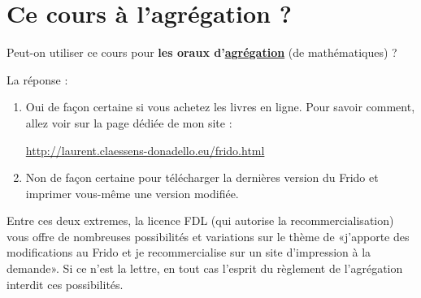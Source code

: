 
\section*{Ce cours à l'agrégation ?}

Peut-on utiliser ce cours pour \textbf{les oraux d'\href{http://agreg.org/}{agrégation}} (de mathématiques) ?  

La réponse :
\begin{enumerate}
    \item
        Oui de façon certaine si vous achetez les livres en ligne. Pour savoir comment, allez voir sur la page dédiée de mon site :
        \begin{center}
            \url{http://laurent.claessens-donadello.eu/frido.html}
        \end{center}
    \item
        Non de façon certaine pour télécharger la dernières version du Frido et imprimer vous-même une version modifiée.
\end{enumerate}
Entre ces deux extremes, la licence FDL (qui autorise la recommercialisation) vous offre de nombreuses possibilités et variations sur le thème de «j'apporte des modifications au Frido et je recommercialise sur un site d'impression à la demande». Si ce n'est la lettre, en tout cas l'esprit du règlement de l'agrégation interdit ces possibilités.

